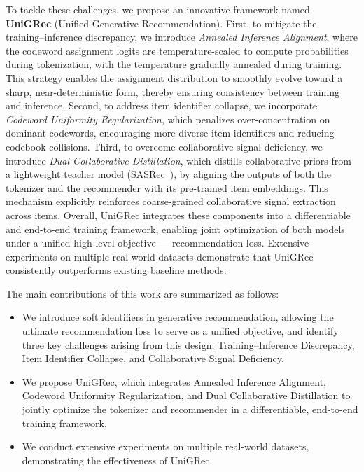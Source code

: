 To tackle these challenges, we propose an innovative framework named \textbf{UniGRec} (Unified Generative Recommendation). First, to mitigate the training–inference discrepancy, we introduce \textit{Annealed Inference Alignment}, where the codeword assignment logits are temperature-scaled to compute probabilities during tokenization, with the temperature gradually annealed during training. This strategy enables the assignment distribution to smoothly evolve toward a sharp, near-deterministic form, thereby ensuring consistency between training and inference. Second, to address item identifier collapse, we incorporate \textit{Codeword Uniformity Regularization}, which penalizes over-concentration on dominant codewords, encouraging more diverse item identifiers and reducing codebook collisions. Third, to overcome collaborative signal deficiency, we introduce \textit{Dual Collaborative Distillation}, which distills collaborative priors from a lightweight teacher model (\eg SASRec~\cite{SASRec}), by aligning the outputs of both the tokenizer and the recommender with its pre-trained item embeddings. This mechanism explicitly reinforces coarse-grained collaborative signal extraction across items. Overall, UniGRec integrates these components into a differentiable and end-to-end training framework, enabling joint optimization of both models under a unified high-level objective --- recommendation loss. Extensive experiments on multiple real-world datasets demonstrate that UniGRec consistently outperforms existing baseline methods.


The main contributions of this work are summarized as follows:
\begin{itemize}[leftmargin=*]
\item We introduce soft identifiers in generative recommendation, allowing the ultimate recommendation loss to serve as a unified objective, and identify three key challenges arising from this design: Training–Inference Discrepancy, Item Identifier Collapse, and Collaborative Signal Deficiency.
\item We propose UniGRec, which integrates Annealed Inference Alignment, Codeword Uniformity Regularization, and Dual Collaborative Distillation to jointly optimize the tokenizer and recommender in a differentiable, end-to-end training framework.
\item We conduct extensive experiments on multiple real-world datasets, demonstrating the effectiveness of UniGRec.
\end{itemize}